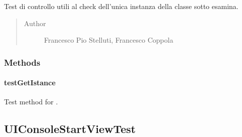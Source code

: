 \documentclass[letterpaper,10pt,italian,openany,oneside]{sphinxmanual}
\begin{document}
\begin{fulllineitems}
\label{\detokenize{test/it/unicam/cs/pa/mastermind/test/UIConsoleInteractionViewTest:it.unicam.cs.pa.mastermind.test.UIConsoleInteractionViewTest}}
Test di controllo utili al check dell’unica instanza della classe sotto esamina.
\begin{quote}\begin{description}
\item[{Author}] \leavevmode
Francesco Pio Stelluti, Francesco Coppola

\end{description}\end{quote}

\end{fulllineitems}



\subsubsection{Methods}
\label{\detokenize{test/it/unicam/cs/pa/mastermind/test/UIConsoleInteractionViewTest:methods}}

\paragraph{testGetIstance}
\label{\detokenize{test/it/unicam/cs/pa/mastermind/test/UIConsoleInteractionViewTest:testgetistance}}

\begin{fulllineitems}
\label{\detokenize{test/it/unicam/cs/pa/mastermind/test/UIConsoleInteractionViewTest:it.unicam.cs.pa.mastermind.test.UIConsoleInteractionViewTest.testGetIstance()}}
Test method for {\hyperref[\detokenize{source/it/unicam/cs/pa/mastermind/ui/ConsoleInteractionView:it.unicam.cs.pa.mastermind.ui.ConsoleInteractionView.getInstance()}]{}}.

\end{fulllineitems}



\subsection{UIConsoleStartViewTest}
\label{\detokenize{test/it/unicam/cs/pa/mastermind/test/UIConsoleStartViewTest:uiconsolestartviewtest}}\label{\detokenize{test/it/unicam/cs/pa/mastermind/test/UIConsoleStartViewTest::doc}}
\end{document}
